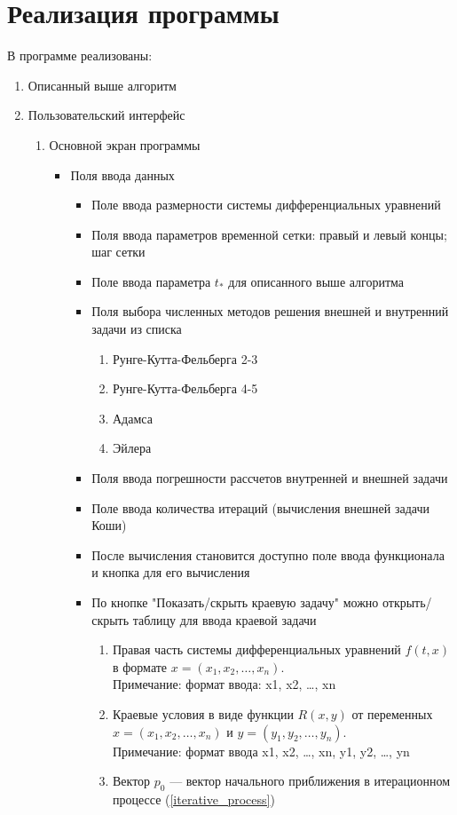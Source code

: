 \section{Реализация программы}
\tolerance
В программе реализованы:
\begin{enumerate}
\item Описанный выше алгоритм
\item Пользовательский интерфейс
\begin{enumerate}
\item Основной экран программы
\begin{itemize}
\item Поля ввода данных
\begin{itemize}
\item Поле ввода размерности системы дифференциальных уравнений
\item Поля ввода параметров временной сетки: правый и левый концы; шаг сетки
\item Поле ввода параметра $t_*$ для описанного выше алгоритма
\item Поля выбора численных методов решения внешней и внутренний задачи из списка
\begin{enumerate}
\item Рунге-Кутта-Фельберга 2-3
\item Рунге-Кутта-Фельберга 4-5
\item Адамса
\item Эйлера
\end{enumerate}
\item Поля ввода погрешности рассчетов внутренней и внешней задачи
\item Поле ввода количества итераций (вычисления внешней задачи Коши)
\item После вычисления становится доступно поле ввода функц\-ионала и кнопка для его вычисления
\item По кнопке "Показать/скрыть краевую задачу" можно открыть/скрыть таблицу для ввода краевой задачи
\begin {enumerate}
\item Правая часть системы дифференциальных уравнений $f(t,x)$ в формате $x=(x_1,x_2,\dots,x_n)$.\\ Примечание: формат ввода: x1, x2, \dots, xn
\item Краевые условия в виде функции $R(x,y)$ от переменных $x=(x_1,x_2,\dots,x_n)$ и $y=(y_1,y_2,\dots,y_n)$. \\Примечание: формат ввода x1, x2, \dots, xn, y1, y2, \dots, yn
\item Вектор $p_0$ --- вектор начального приближения в итерационном процессе (\ref{iterative_process})

\end{enumerate}
\end{itemize}
\end{itemize}
\end{enumerate}
\end{enumerate}
